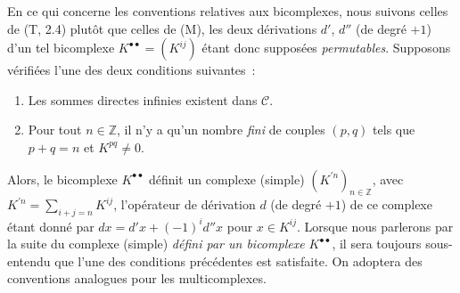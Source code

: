 \begin{env}[11.3.1]
\label{0.11.3.1-fr}
En ce qui concerne les conventions relatives aux bicomplexes, nous suivons
celles de (T, 2.4) plutôt que celles de (M), les deux dérivations $d'$, $d''$
(de degré $+1$) d'un tel bicomplexe
$K^{\bullet\bullet}=(K^{ij})$ étant donc supposées \emph{permutables}.
Supposons vérifiées l'une des deux conditions suivantes~:
\begin{enumerate}
  \item[$1^\circ$] Les sommes directes infinies existent dans $\mathcal C$.
  \item[$2^\circ$] Pour tout $n\in\mathbb Z$, il n'y a qu'un nombre
    \emph{fini} de couples $(p,q)$ tels que $p+q=n$ et $K^{pq}\ne0$.
\end{enumerate}
Alors, le bicomplexe $K^{\bullet\bullet}$ définit un complexe (simple)
$(K^{\prime n})_{n\in\mathbb Z}$, avec
$K^{\prime n}=\sum_{i+j=n}K^{ij}$, l'opérateur de dérivation $d$ (de degré
$+1$) de ce complexe étant donné par
$dx=d'x+(-1)^i d''x$ pour $x\in K^{ij}$. Lorsque nous parlerons par la suite
du complexe (simple) \emph{défini par un bicomplexe $K^{\bullet\bullet}$}, il
sera toujours sous-entendu que l'une des conditions précédentes est satisfaite.
On adoptera des conventions analogues pour les multicomplexes.


\end{env}
